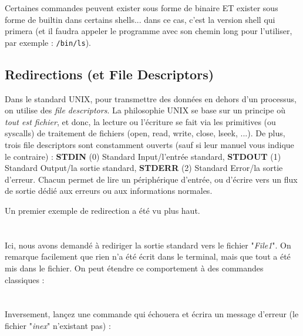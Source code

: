 Certaines commandes peuvent exister sous forme de binaire ET exister sous forme de builtin dans certains shells... dans ce cas, c'est la version shell qui primera (et il faudra appeler le programme avec son chemin long pour l'utiliser, par exemple : \texttt{/bin/ls}).\\

\bigskip


\newpage
\subsection{Redirections (et File Descriptors)}

\bigskip

Dans le standard UNIX, pour transmettre des données en dehors d'un processus, on utilise des \textit{file descriptors}.
La philosophie UNIX se base sur un principe où \textit{tout est fichier}, et donc, la lecture ou l'écriture se fait via les primitives (ou syscalls) de traitement de fichiers (open, read, write, close, lseek, ...).
De plus, trois file descriptors sont constamment ouverts (sauf si leur manuel vous indique le contraire) : \textbf{STDIN} (0) Standard Input/l'entrée standard, \textbf{STDOUT} (1) Standard Output/la sortie standard, \textbf{STDERR} (2) Standard Error/la sortie d'erreur.
Chacun permet de lire un périphérique d'entrée, ou d'écrire vers un flux de sortie dédié aux erreurs ou aux informations normales.\\

\bigskip

Un premier exemple de redirection a été vu plus haut.\\

\\
\\

Ici, nous avons demandé à rediriger la sortie standard vers le fichier "\textit{File1}".
On remarque facilement que rien n'a été écrit dans le terminal, mais que tout a été mis dans le fichier.
On peut étendre ce comportement à des commandes classiques :\\

\\
\\

Inversement, lançez une commande qui échouera et écrira un message d'erreur (le fichier "\textit{inex}" n'existant pas) :\\

